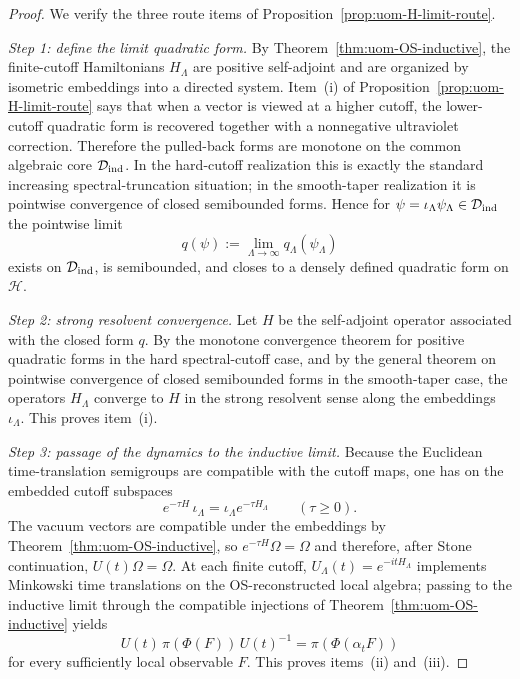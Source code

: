 \documentclass[10pt]{article}
\theoremstyle{definition}
\theoremstyle{plain}
\begin{document}
\begin{proof}
We verify the three route items of Proposition~\ref{prop:uom-H-limit-route}.

\emph{Step 1: define the limit quadratic form.}
By Theorem~\ref{thm:uom-OS-inductive}, the finite-cutoff Hamiltonians $H_\Lambda$ are positive self-adjoint and are organized by isometric embeddings into a directed system.  Item~\textnormal{(i)} of Proposition~\ref{prop:uom-H-limit-route} says that when a vector is viewed at a higher cutoff, the lower-cutoff quadratic form is recovered together with a nonnegative ultraviolet correction.  Therefore the pulled-back forms are monotone on the common algebraic core $\mathcal D_{\rm ind}$.  In the hard-cutoff realization this is exactly the standard increasing spectral-truncation situation; in the smooth-taper realization it is pointwise convergence of closed semibounded forms.  Hence for $\psi=\iota_\Lambda\psi_\Lambda\in\mathcal D_{\rm ind}$ the pointwise limit
\[
q(\psi):=\lim_{\Lambda\to\infty} q_\Lambda(\psi_\Lambda)
\]
exists on $\mathcal D_{\rm ind}$, is semibounded, and closes to a densely defined quadratic form on $\mathcal H$.

\emph{Step 2: strong resolvent convergence.}
Let $H$ be the self-adjoint operator associated with the closed form $q$.  By the monotone convergence theorem for positive quadratic forms in the hard spectral-cutoff case, and by the general theorem on pointwise convergence of closed semibounded forms in the smooth-taper case, the operators $H_\Lambda$ converge to $H$ in the strong resolvent sense along the embeddings $\iota_\Lambda$.  This proves item~\textnormal{(i)}.

\emph{Step 3: passage of the dynamics to the inductive limit.}
Because the Euclidean time-translation semigroups are compatible with the cutoff maps, one has on the embedded cutoff subspaces
\[
e^{-\tau H}\,\iota_\Lambda
=
\iota_\Lambda e^{-\tau H_\Lambda}
\qquad
(\tau\ge 0).
\]
The vacuum vectors are compatible under the embeddings by Theorem~\ref{thm:uom-OS-inductive}, so $e^{-\tau H}\Omega=\Omega$ and therefore, after Stone continuation, $U(t)\Omega=\Omega$.  At each finite cutoff, $U_\Lambda(t)=e^{-itH_\Lambda}$ implements Minkowski time translations on the OS-reconstructed local algebra; passing to the inductive limit through the compatible injections of Theorem~\ref{thm:uom-OS-inductive} yields
\[
U(t)\,\pi(\Phi(F))\,U(t)^{-1}
=
\pi(\Phi(\alpha_tF))
\]
for every sufficiently local observable $F$.  This proves items~\textnormal{(ii)} and~\textnormal{(iii)}.
\end{proof}
\end{document}
